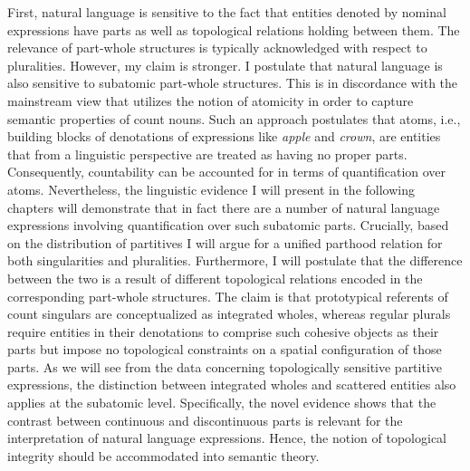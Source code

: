 First, natural language is sensitive to the fact that entities denoted by nominal expressions have parts as well as topological relations holding between them. The relevance of part-whole structures is typically acknowledged with respect to pluralities. However, my claim is stronger. I postulate that natural language is also sensitive to subatomic part-whole structures. This is in discordance with the mainstream view that utilizes the notion of atomicity in order to capture semantic properties of count nouns. Such an approach postulates that atoms, i.e., building blocks of denotations of expressions like \textit{apple} and \textit{crown}, are entities that from a linguistic perspective are treated as having no proper parts. Consequently, countability can be accounted for in terms of quantification over atoms. Nevertheless, the linguistic evidence I will present in the following chapters will demonstrate that in fact there are a number of natural language expressions involving quantification over such subatomic parts. Crucially, based on the distribution of partitives I will argue for a unified parthood relation for both singularities and pluralities. Furthermore, I will postulate that the difference between the two is a result of different topological relations encoded in the corresponding part-whole structures. The claim is that prototypical referents of count singulars are conceptualized as integrated wholes, whereas regular plurals require entities in their denotations to comprise such cohesive objects as their parts but impose no topological constraints on a spatial configuration of those parts. As we will see from the data concerning topologically sensitive partitive expressions, the distinction between integrated wholes and scattered entities also applies at the subatomic level. Specifically, the novel evidence shows that the contrast between continuous and discontinuous parts is relevant for the interpretation of natural language expressions. Hence, the notion of topological integrity should be accommodated into semantic theory.

